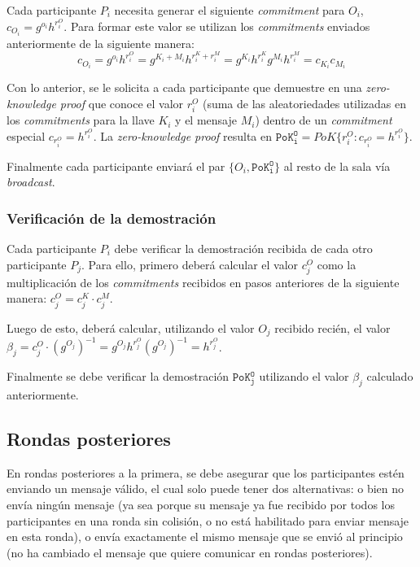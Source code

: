 Cada participante $P_i$ necesita generar el siguiente \emph{commitment} para 
$O_i$, $c_{O_i} = g^{o_i} h^{r_i^O}$. Para formar este valor se utilizan los \emph{commitments} 
enviados anteriormente de la siguiente manera: 
$$c_{O_i} = g^{o_i} h^{r_i^O} = g^{K_i + M_i} h^{r_i^K + r_i^M} = g^{K_i} h^{r_i^K} g^{M_i} h^{r_i^M} = c_{K_i} c_{M_i}$$

Con lo anterior, se le solicita a cada participante que demuestre en una \emph{zero-knowledge proof} 
que conoce el valor $r_i^O$ (suma de las aleatoriedades utilizadas en los 
\emph{commitments} para la llave $K_i$ y el mensaje $M_i$) dentro de un \emph{commitment} 
especial $c_{r_i^O} = h^{r_i^O}$. La \emph{zero-knowledge proof} resulta en 
$\mathtt{PoK_i^O} = PoK\{r_i^O : c_{r_i^O} = h^{r_i^O}\}$.

Finalmente cada participante enviará el par $\{O_i, \mathtt{PoK_i^O}\}$ al resto de 
la sala vía \emph{broadcast}.

\subsubsection{Verificación de la demostración}

Cada participante $P_i$ debe verificar la demostración recibida de cada otro 
participante $P_j$. Para ello, primero deberá calcular el valor $c_j^O$ como la 
multiplicación de los \emph{commitments} recibidos en pasos anteriores de la 
siguiente manera: $c_j^O = c_j^K \cdot c_j^M$.

Luego de esto, deberá calcular, utilizando el valor $O_j$ recibido recién, el 
valor $\beta_j = c_j^O \cdot (g^{O_j})^{-1} = g^{O_j} h^{r_j^O} (g^{O_j})^{-1} = h^{r_j^O}$.

Finalmente se debe verificar la demostración $\mathtt{PoK_j^O}$ utilizando el 
valor $\beta_j$ calculado anteriormente.

\subsection{Rondas posteriores}

En rondas posteriores a la primera, se debe asegurar que los participantes estén 
enviando un mensaje válido, el cual solo puede tener dos alternativas: o bien no envía 
ningún mensaje (ya sea porque su mensaje ya fue recibido por todos los participantes 
en una ronda sin colisión, o no está habilitado para enviar mensaje en esta ronda), o 
envía exactamente el mismo mensaje que se envió al principio (no ha cambiado el mensaje 
que quiere comunicar en rondas posteriores).


